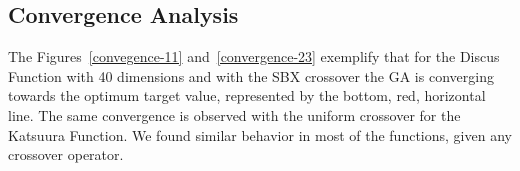 \subsection{Convergence Analysis}
The Figures~\ref{convegence-11} and~\ref{convergence-23} exemplify that for the Discus Function with 40 dimensions and with the SBX crossover the GA is converging towards the optimum target value, represented by the bottom, red, horizontal line. The same convergence is observed with the uniform crossover for the Katsuura Function. We found similar behavior in most of the functions, given any crossover operator.
%
